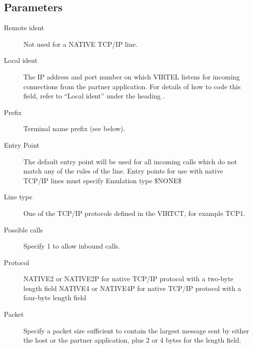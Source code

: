 \documentclass[letterpaper,10pt,english]{sphinxmanual}
\begin{document}


\subsection{Parameters}
\label{\detokenize{connectivity_guide:id12}}\label{\detokenize{connectivity_guide:index-35}}\begin{description}
\item[{Remote ident}] \leavevmode
Not used for a NATIVE TCP/IP line.

\item[{Local ident}] \leavevmode
The IP address and port number on which VIRTEL listens for incoming connections from the partner application. For details of how to code this field, refer to “Local ident” under the heading {\hyperref[\detokenize{connectivity_guide:bookmark13}]{}}.

\item[{Prefix}] \leavevmode
Terminal name prefix (see below).

\item[{Entry Point}] \leavevmode
The default entry point will be used for all incoming calls which do not match any of the rules of the line. Entry points for use with native TCP/IP lines must specify Emulation type \$NONE\$

\item[{Line type}] \leavevmode
One of the TCP/IP protocols defined in the VIRTCT, for example TCP1.

\item[{Possible calls}] \leavevmode
Specify 1 to allow inbound calls.

\item[{Protocol}] \leavevmode
NATIVE2 or NATIVE2P for native TCP/IP protocol with a two-byte length field NATIVE4 or NATIVE4P for native TCP/IP protocol with a four-byte length field

\item[{Packet}] \leavevmode
Specify a packet size sufficient to contain the largest message sent by either the host or the partner application, plus 2 or 4 bytes for the length field.

\end{description}

\end{document}
